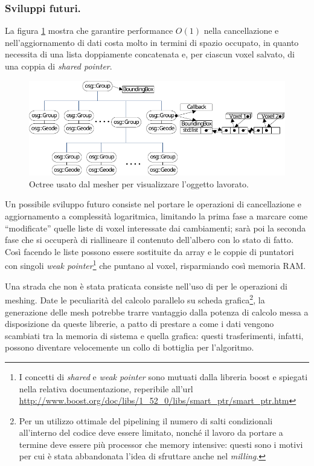 \subsubsection{Sviluppi futuri.}
La figura \ref{fig:meshing_octree} mostra che garantire performance $O(1)$ nella cancellazione e nell'aggiornamento di dati costa molto in termini di spazio occupato, in quanto necessita di una lista doppiamente concatenata e, per ciascun voxel salvato, di una coppia di \emph{shared pointer}.
\begin{figure}[htp]
	\centering
	\includegraphics[width=.85\textwidth]{img/meshing_octree}
	\caption{Octree usato dal mesher per visualizzare l'oggetto lavorato.}
	\label{fig:meshing_octree}
\end{figure}
Un possibile sviluppo futuro consiste nel portare le operazioni di cancellazione e aggiornamento a complessità logaritmica, limitando la prima fase a marcare come ``modificate'' quelle liste di voxel interessate dai cambiamenti; sarà poi la seconda fase che si occuperà di riallineare il contenuto dell'albero con lo stato di fatto. Così facendo le liste possono essere sostituite da array e le coppie di puntatori con singoli \emph{weak pointer}\footnote{I concetti di \emph{shared} e \emph{weak pointer} sono mutuati dalla libreria boost e spiegati nella relativa documentazione, reperibile all'url \url{http://www.boost.org/doc/libs/1_52_0/libs/smart_ptr/smart_ptr.htm}} che puntano al voxel, risparmiando così memoria RAM.

Una strada che non è stata praticata consiste nell'uso di \cuda per le operazioni di meshing. Date le peculiarità del calcolo parallelo su scheda grafica\footnote{Per un utilizzo ottimale del pipelining il numero di salti condizionali all'interno del codice deve essere limitato, nonché il lavoro da portare a termine deve essere più processor che memory intensive: questi sono i motivi per cui è stata abbandonata l'idea di sfruttare \cuda anche nel \emph{milling}.}, la generazione delle mesh potrebbe trarre vantaggio dalla potenza di calcolo messa a disposizione da queste librerie, a patto di prestare a come i dati vengono scambiati tra la memoria di sistema e quella grafica: questi trasferimenti, infatti, possono diventare velocemente un collo di bottiglia per l'algoritmo.
